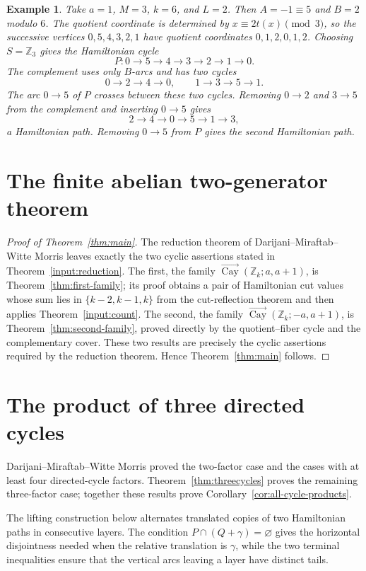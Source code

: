 \documentclass[11pt]{article}
\newtheorem{example}[theorem]{Example}
\newcommand{\Cay}{\overrightarrow{\operatorname{Cay}}}
\newcommand{\Z}{\mathbb Z}
\begin{document}
\begin{example}\label{ex:second-family}
Take $a=1$, $M=3$, $k=6$, and $L=2$.  Then $A=-1\equiv5$ and $B=2$ modulo $6$.  The quotient coordinate is determined by $x\equiv 2t(x)\pmod 3$, so the successive vertices $0,5,4,3,2,1$ have quotient coordinates $0,1,2,0,1,2$.  Choosing $S=\Z_3$ gives the Hamiltonian cycle
\[
        P:
        0\to5\to4\to3\to2\to1\to0.
\]
The complement uses only $B$-arcs and has two cycles
\[
        0\to2\to4\to0,
        \qquad
        1\to3\to5\to1.
\]
The arc $0\to5$ of $P$ crosses between these two cycles.  Removing $0\to2$ and $3\to5$ from the complement and inserting $0\to5$ gives
\[
        2\to4\to0\to5\to1\to3,
\]
a Hamiltonian path.  Removing $0\to5$ from $P$ gives the second Hamiltonian path.
\end{example}

\FloatBarrier
\section{The finite abelian two-generator theorem}

\begin{proof}[Proof of Theorem~\ref{thm:main}]
The reduction theorem of Darijani--Miraftab--Witte Morris leaves exactly the two cyclic assertions stated in Theorem~\ref{input:reduction}.  The first, the family $\Cay(\Z_k;a,a+1)$, is Theorem~\ref{thm:first-family}; its proof obtains a pair of Hamiltonian cut values whose sum lies in $\{k-2,k-1,k\}$ from the cut-reflection theorem and then applies Theorem~\ref{input:count}.  The second, the family $\Cay(\Z_k;-a,a+1)$, is Theorem~\ref{thm:second-family}, proved directly by the quotient--fiber cycle and the complementary cover.  These two results are precisely the cyclic assertions required by the reduction theorem.  Hence Theorem~\ref{thm:main} follows.
\end{proof}

\FloatBarrier
\section{The product of three directed cycles}\label{sec:threecycles}

Darijani--Miraftab--Witte Morris proved the two-factor case and the cases with at least four directed-cycle factors.  Theorem~\ref{thm:threecycles} proves the remaining three-factor case; together these results prove Corollary~\ref{cor:all-cycle-products}.

The lifting construction below alternates translated copies of two Hamiltonian paths in consecutive layers.  The condition $P\cap(Q+\gamma)=\varnothing$ gives the horizontal disjointness needed when the relative translation is $\gamma$, while the two terminal inequalities ensure that the vertical arcs leaving a layer have distinct tails.
\end{document}
